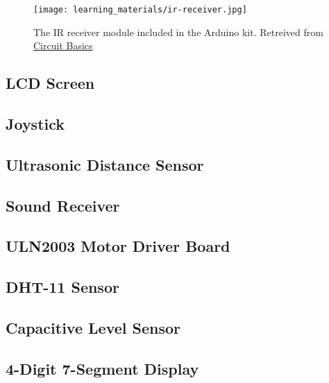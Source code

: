     \begin{figure}[h]
        \texttt{[image: learning\_materials/ir-receiver.jpg]}
        \caption[IR Receiver]{The IR receiver module included in the Arduino kit. 
        Retreived from \href{https://www.circuitbasics.com/arduino-ir-remote-receiver-tutorial/}
        {Circuit Basics}}
    \end{figure}

    \subsection*{LCD Screen}


    \subsection*{Joystick}


    \subsection*{Ultrasonic Distance Sensor}


    \subsection*{Sound Receiver}


    \subsection*{ULN2003 Motor Driver Board}


    \subsection*{DHT-11 Sensor}


    \subsection*{Capacitive Level Sensor}


    \subsection*{4-Digit 7-Segment Display}
